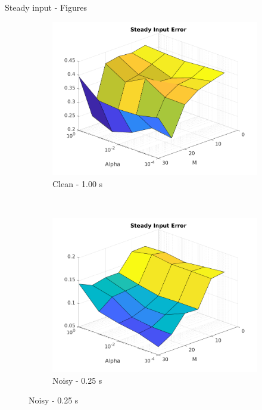 \documentclass{beamer}
\begin{document}
\begin{frame}{Steady input - Figures}
\begin{figure}
        \hfill
        \begin{subfigure}[b]{0.3\textwidth}
            \centering
            \includegraphics[width=\textwidth]{Figures_Clean/figure_steady_T_1.00.png}
            \caption{Clean - 1.00 s}
            \label{fig:clean_steady_100}
        \end{subfigure}
        \\
        \begin{subfigure}[b]{0.3\textwidth}
            \centering
            \includegraphics[width=\textwidth]{Figures_Noisy/figure_steady_T_0.25.png}
            \caption{Noisy - 0.25 s}
            \label{fig:noisy_steady_025}
        \end{subfigure}
        \hfill

\end{figure}
\end{frame}
\end{document}
